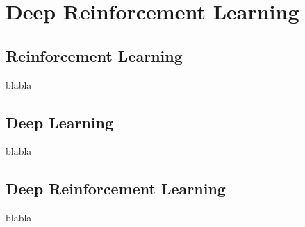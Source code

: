 
\chapter{Deep Reinforcement Learning} %

\label{Chapter1} %


\section{Reinforcement Learning}

blabla


\section{Deep Learning}

blabla

\section{Deep Reinforcement Learning}

blabla